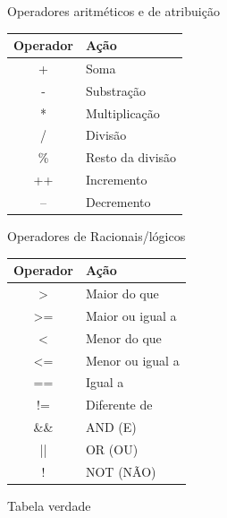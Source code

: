 \begin{frame}{Operadores aritméticos e de atribuição}

\begin{tabular}{|c|l|}
\hline
\textbf{Operador} & \textbf{Ação}   \\ \hline
+ & Soma      \\ \hline
- & Substração  \\ \hline
* & Multiplicação    \\ \hline
/ & Divisão     \\ \hline
\%  & Resto da divisão   \\ \hline
++ & Incremento\\ \hline
-- & Decremento     \\ \hline

\end{tabular}


	\vspace{1em}
\end{frame}



\begin{frame}{Operadores de Racionais/lógicos}


\begin{tabular}{|c|l|}
\hline
\textbf{Operador} & \textbf{Ação}   \\ \hline
> & Maior do que      \\ \hline
>= & Maior ou igual a  \\ \hline
< & Menor do que    \\ \hline
<= & Menor ou igual a     \\ \hline
==  & Igual a   \\ \hline
!= & Diferente de\\ \hline
\&\& & AND (E) \\ \hline
|| & OR (OU) \\ \hline
! & NOT (NÃO) \\ \hline

\end{tabular}

	\vspace{1em}
\end{frame}

\begin{frame}{Tabela verdade}
    \fontsize{12pt}{15.2}\par

	\vspace{1em}
\end{frame}


